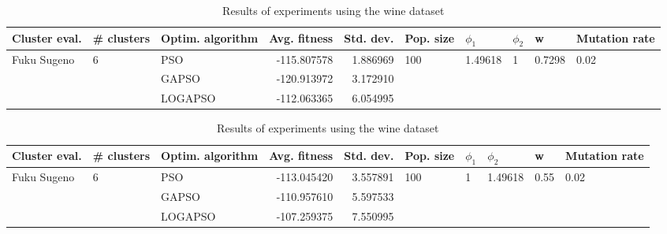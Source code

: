 \documentclass{article}
\begin{document}
\begin{table}
\centering
\caption{Results of experiments using the wine dataset}
\begin{tabular}{lllrrlllll}
\toprule
               Cluster eval. &        \# clusters & Optim. algorithm &  Avg. fitness &  Std. dev. &            Pop. size &               $\phi_{1}$ &         $\phi_{2}$ &                       w &         Mutation rate \\
\midrule
\multirow{3}{*}{Fuku Sugeno} & \multirow{3}{*}{6} &              PSO &   -115.807578 &   1.886969 & \multirow{3}{*}{100} & \multirow{3}{*}{1.49618} & \multirow{3}{*}{1} & \multirow{3}{*}{0.7298} & \multirow{3}{*}{0.02} \\
                             &                    &            GAPSO &   -120.913972 &   3.172910 &                      &                          &                    &                         &                       \\
                             &                    &          LOGAPSO &   -112.063365 &   6.054995 &                      &                          &                    &                         &                       \\
\bottomrule
\end{tabular}
\end{table}
\begin{table}
\centering
\caption{Results of experiments using the wine dataset}
\begin{tabular}{lllrrlllll}
\toprule
               Cluster eval. &        \# clusters & Optim. algorithm &  Avg. fitness &  Std. dev. &            Pop. size &         $\phi_{1}$ &               $\phi_{2}$ &                     w &         Mutation rate \\
\midrule
\multirow{3}{*}{Fuku Sugeno} & \multirow{3}{*}{6} &              PSO &   -113.045420 &   3.557891 & \multirow{3}{*}{100} & \multirow{3}{*}{1} & \multirow{3}{*}{1.49618} & \multirow{3}{*}{0.55} & \multirow{3}{*}{0.02} \\
                             &                    &            GAPSO &   -110.957610 &   5.597533 &                      &                    &                          &                       &                       \\
                             &                    &          LOGAPSO &   -107.259375 &   7.550995 &                      &                    &                          &                       &                       \\
\bottomrule
\end{tabular}
\end{table}
\end{document}

